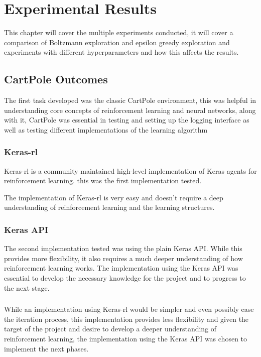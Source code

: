 \chapter{Experimental Results}
This chapter will cover the multiple experiments conducted, it will cover a comparison of Boltzmann exploration and epsilon greedy exploration and experiments with different hyperparameters and how this affects the results.

\section{CartPole Outcomes}
The first task developed was the classic CartPole environment,
this was helpful in understanding core concepts of reinforcement learning and neural networks, along with it,
CartPole was essential in testing and setting up the logging interface as well as testing different implementations of the learning algorithm 
\subsection*{Keras-rl}
Keras-rl is a community maintained high-level implementation of Keras agents for reinforcement learning. 
this was the first implementation tested.

The implementation of Keras-rl is very easy and doesn't require a deep understanding of reinforcement learning and the learning structures.
\subsection*{Keras API}
The second implementation tested was using the plain Keras API. While this provides more flexibility, it also requires a much deeper understanding of how reinforcement learning works.
The implementation using the Keras API was essential to develop the necessary knowledge for the project and to progress to the next stage.
\subsection*{}

While an implementation using Keras-rl would be simpler and even possibly ease the iteration process, this implementation provides less flexibility and given the target of the project and 
desire to develop a deeper understanding of reinforcement learning, the implementation using the Keras API was chosen to implement the next phases.

